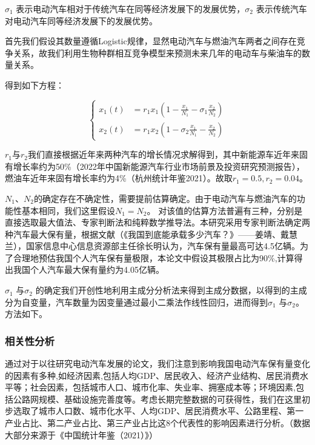 \documentclass[12pt, a4paper, oneside]{ctexart}
\begin{document}
$\sigma_1$
  表示电动汽车相对于传统汽车在同等经济发展下的发展优势，$\sigma_2$
表示传统汽车对电动汽车同等经济发展下的发展优势。

首先我们假设其数量遵循Logistic规律，显然电动汽车与燃油汽车两者之间存在竞争关系，故我们利用生物种群相互竞争模型来预测未来几年的电动车与柴油车的数量关系。

得到如下方程：

\begin{dmath}
  \left\{
    \begin{aligned}
      x_1(t) & = r_1x_1(1-\frac{x_1}{N_1}-\sigma_1\frac{x_2}{N_2}) \\
      x_2(t) & = r_1x_2(1-\sigma_2\frac{x_1}{N_1}-\frac{x_2}{N_2})
    \end{aligned}
    \right.
\end{dmath}

$r_1$与$r_2$我们直接根据近年来两种汽车的增长情况求解得到，其中新能源车近年来固有增长率约为50\%（2022年中国新能源汽车行业市场前景及投资研究预测报告），燃油车近年来固有增长率约为4\%（杭州统计年鉴2021）。故取$r_1=0.5,r_2=0.04$。

$N_1$、$N_2$的确定存在不确定性，需要提前估算确定。由于电动汽车与燃油汽车的功能性基本相同，我们这里假设$N_1=N_2$。
对该值的估算方法普遍有三种，分别是直接选取最大值法、专家判断法和纯粹数学推导法。本研究采用专家判断法确定两种汽车最大保有量，根据文献（《我国到底能承载多少汽车？》------姜靖、戴慧兰），国家信息中心信息资源部主任徐长明认为，汽车保有量最高可达4.5亿辆。为了合理地预估我国个人汽车保有量极限，本论文中假设其极限占比为90\%,计算得出我国个人汽车最大保有量约为4.05亿辆。

$\sigma_1$ 与$\sigma_2$
的确定我们开创性地利用主成分分析法来得到主成分数据，以得到的主成分为自变量，汽车数量为因变量通过最小二乘法作线性回归，进而得到$\sigma_1$
  与$\sigma_2$。 方法如下。

\subsubsection{相关性分析}

通过对于以往研究电动汽车发展的论文，我们注意到影响我国电动汽车保有量变化的因素有多种,如经济因素,包括人均GDP、居民收入、经济产业结构、居民消费水平等；社会因素，包括城市人口、城市化率、失业率、拥塞成本等；环境因素,包括公路网规模、基础设施完善度等。考虑长期完整数据的可获得性，我们在这里初步选取了城市人口数、城市化水平、人均GDP、居民消费水平、公路里程、第一产业占比、第二产业占比、第三产业占比这8个代表性的影响因素进行分析。（数据大部分来源于《中国统计年鉴（2021）》\cite{cite:统计年鉴}）
\end{document}
